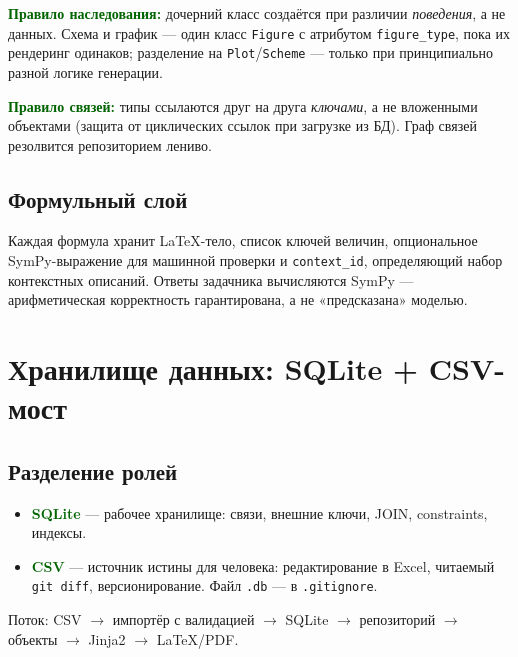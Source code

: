 \documentclass[12pt,a4paper]{article}
\newcommand{\idea}[1]{\textcolor{darkgreen}{\textbf{#1}}}
\begin{document}
\idea{Правило наследования:} дочерний класс создаётся при различии \emph{поведения}, а не данных. Схема и график --- один класс \texttt{Figure} с атрибутом \texttt{figure\_type}, пока их рендеринг одинаков; разделение на \texttt{Plot}/\texttt{Scheme} --- только при принципиально разной логике генерации.

\idea{Правило связей:} типы ссылаются друг на друга \emph{ключами}, а не вложенными объектами (защита от циклических ссылок при загрузке из БД). Граф связей резолвится репозиторием лениво.

\subsection{Формульный слой}
Каждая формула хранит LaTeX-тело, список ключей величин, опциональное SymPy-выражение для машинной проверки и \texttt{context\_id}, определяющий набор контекстных описаний. Ответы задачника вычисляются SymPy --- арифметическая корректность гарантирована, а не «предсказана» моделью.

\section{Хранилище данных: SQLite + CSV-мост}

\subsection{Разделение ролей}
\begin{itemize}
  \item \idea{SQLite} --- рабочее хранилище: связи, внешние ключи, JOIN, constraints, индексы.
  \item \idea{CSV} --- источник истины для человека: редактирование в Excel, читаемый \texttt{git diff}, версионирование. Файл \texttt{.db} --- в \texttt{.gitignore}.
\end{itemize}
Поток: CSV $\to$ импортёр с валидацией $\to$ SQLite $\to$ репозиторий $\to$ объекты $\to$ Jinja2 $\to$ LaTeX/PDF.
\end{document}
